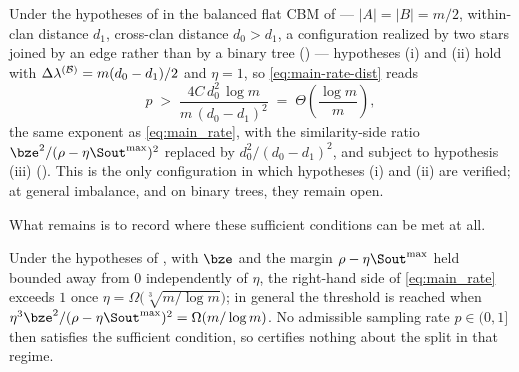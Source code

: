 \begin{corollary}\label{cor:dist-balanced}
Under the hypotheses of  in the balanced flat CBM of
 --- $|A|=|B|=m/2$, within-clan distance $d_1$, cross-clan
distance $d_0>d_1$, a configuration realized by two stars joined by an edge
rather than by a binary tree () --- hypotheses (i) and
(ii) hold with $\Delta\lambda^{(\mathcal{B})}=m(d_0-d_1)/2$ and $\eta=1$, so \eqref{eq:main-rate-dist}
reads
\begin{equation}\label{eq:main-rate-dist-balanced}
   p \;>\; \frac{4C\,d_0^{2}\,\log m}{m\,(d_0-d_1)^{2}}
     \;=\; \Theta\!\left(\frac{\log m}{m}\right),
\end{equation}
the same exponent as \eqref{eq:main_rate}, with the similarity-side ratio
$\bze^{2}/(\rho-\eta\Sout^{\max})^{2}$ replaced by $d_0^{2}/(d_0-d_1)^{2}$, and
subject to hypothesis (iii) (). This is the only
configuration in which hypotheses (i) and (ii) are verified; at general imbalance,
and on binary trees, they remain open.
\end{corollary}

\noindent What remains is to record where these sufficient conditions can be met
at all.

\begin{corollary}\label{cor:infeasible}
Under the hypotheses of , with $\bze$ and the margin
$\rho-\eta\Sout^{\max}$ held bounded away from $0$ independently of $\eta$, the
right-hand side of \eqref{eq:main_rate} exceeds $1$ once
$\eta=\Omega\!\bigl(\sqrt[3]{m/\log m}\bigr)$; in general the threshold is
reached when $\eta^3\bze^2/(\rho-\eta\Sout^{\max})^2=\Omega(m/\log m)$. No admissible sampling rate
$p\in(0,1]$ then satisfies the sufficient condition, so 
certifies nothing about the split in that regime.
\end{corollary}

